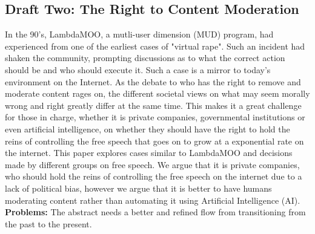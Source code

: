 \documentclass[a4paper]{article}
\begin{document}
\subsection{Draft Two: The Right to Content Moderation}
In the 90's, LambdaMOO, a mutli-user dimension (MUD) program, had experienced from one of the earliest cases of "virtual rape".
Such an incident had shaken the community, prompting discussions as to what the correct action should be and who
should execute it. Such a case is a mirror to today's environment on the Internet. As the debate to who has the right to remove 
and moderate content rages on, the different societal views on what may seem morally wrong and right greatly differ at the same 
time. This makes it a great challenge for those in charge, whether it is private companies, governmental institutions or even
artificial intelligence, on whether they should have the right to hold the reins of controlling the free speech that goes on to
grow at a exponential rate on the internet. This paper explores cases similar to LambdaMOO and decisions made by different groups 
on free speech. We argue that it is private companies, who should hold the reins of controlling the free speech on the internet 
due to a lack of political bias, however we argue that it is better to have humans moderating content rather than automating it 
using Artificial Intelligence (AI). \\

\noindent \textbf{Problems:} The abstract needs a better and refined flow from transitioning from the past to the present.






\newpage










\newpage

\begin{thebibliography}{99}

\end{thebibliography}
\end{document}
